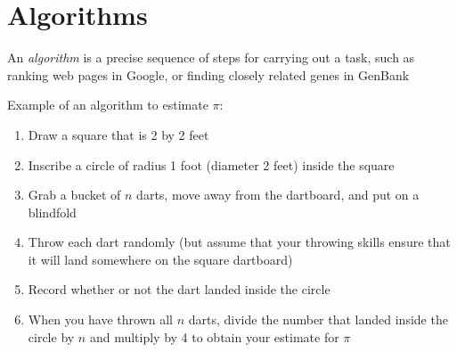 \documentclass[8pt,a4paper,compress]{beamer}
\begin{document}
\section{Algorithms}
\begin{frame}[fragile]
An \emph{algorithm} is a precise sequence of steps for carrying out a task, such as ranking web pages in Google, or finding closely related genes in GenBank

\bigskip

Example of an algorithm to estimate $\pi$:

\begin{enumerate}
\item Draw a square that is 2 by 2 feet
\item Inscribe a circle of radius 1 foot (diameter 2 feet) inside the square
\item Grab a bucket of $n$ darts, move away from the dartboard, and put on a blindfold
\item Throw each dart randomly (but assume that your throwing skills ensure that it will land somewhere on the square dartboard)
\item Record whether or not the dart landed inside the circle
\item When you have thrown all $n$ darts, divide the number that landed inside the circle by $n$ and multiply by 4 to obtain your estimate for $\pi$
\end{enumerate}
\end{frame}
\end{document}
